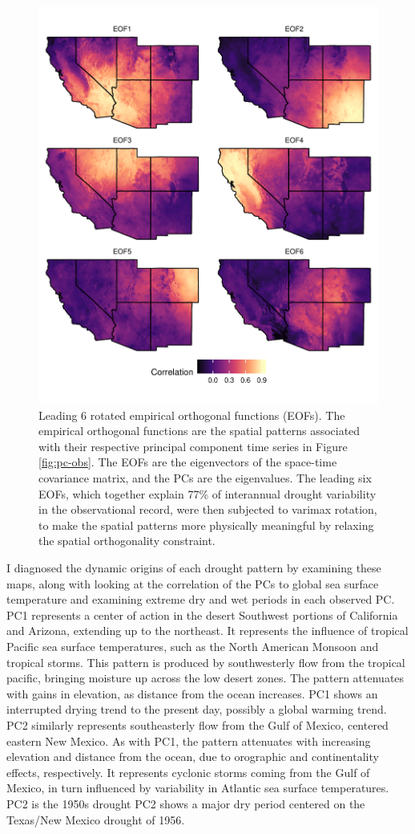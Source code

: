 \documentclass[10pt]{iopart}
\begin{document}
\begin{figure}[htbp!]
\centering
\includegraphics[width=.8\linewidth]{figures/reof_observed.pdf}
\caption{Leading 6 rotated empirical orthogonal functions (EOFs). The empirical orthogonal functions are the spatial patterns associated with their respective principal component time series in Figure \ref{fig:pc-obs}. The EOFs are the eigenvectors of the space-time covariance matrix, and the PCs are the eigenvalues. The leading six EOFs, which together explain 77\% of interannual drought variability in the observational record, were then subjected to varimax rotation, to make the spatial patterns more physically meaningful by relaxing the spatial orthogonality constraint.}
\label{fig:eofs}
\end{figure}

I diagnosed the dynamic origins of each drought pattern by examining these maps, along with looking at the correlation of the PCs to global sea surface temperature and examining extreme dry and wet periods in each observed PC.
PC1 represents a center of action in the desert Southwest portions of California and Arizona, extending up to the northeast. It represents the influence of tropical Pacific sea surface temperatures, such as the North American Monsoon and tropical storms. This pattern is produced by southwesterly flow from the tropical pacific, bringing moisture up across the low desert zones. The pattern attenuates with gains in elevation, as distance from the ocean increases. PC1 shows an interrupted drying trend to the present day, possibly a global warming trend. PC2 similarly represents southeasterly flow from the Gulf of Mexico, centered eastern New Mexico. As with PC1, the pattern attenuates with increasing elevation and distance from the ocean, due to orographic and continentality effects, respectively. It represents cyclonic storms coming from the Gulf of Mexico, in turn influenced by variability in Atlantic sea surface temperatures. PC2 is the 1950s drought PC2 shows a major dry period centered on the Texas/New Mexico drought of 1956. 
\end{document}
